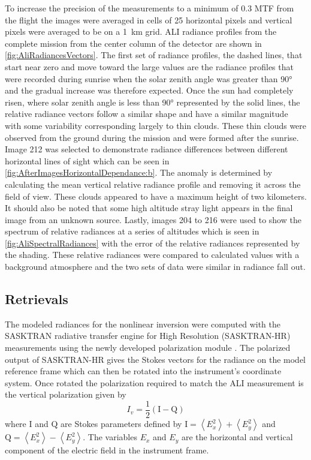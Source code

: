 \documentclass[12pt]{article}
\begin{document}
To increase the precision of the measurements to a minimum of 0.3 MTF from the flight the images were averaged in cells of 25 horizontal pixels and vertical pixels were averaged to be on a 1~km grid.  ALI radiance profiles from the complete mission from the center column of the detector are shown in \autoref{fig:AliRadiancesVectors}. The first set of radiance profiles, the dashed lines, that start near zero and move toward the large values are the radiance profiles that were recorded during sunrise when the solar zenith angle was greater than 90\si{\degree} and the gradual increase was therefore expected. Once the sun had completely risen, where solar zenith angle is less than 90\si{\degree} represented by the solid lines, the relative radiance vectors follow a similar shape and have a similar magnitude with some variability corresponding largely to thin clouds. These thin clouds were observed from the ground during the mission and were formed after the sunrise. Image 212 was selected to demonstrate radiance differences between different horizontal lines of sight which can be seen in \autoref{fig:AfterImagesHorizontalDependance:b}. The anomaly is determined by calculating the mean vertical relative radiance profile and removing it across the field of view. These clouds appeared to have a maximum height of two kilometers. It should also be noted that some high altitude stray light appears in the final image from an unknown source. Lastly, images 204 to 216 were used to show the spectrum of relative radiances at a series of altitudes which is seen in \autoref{fig:AliSpectralRadiances} with the error of the relative radiances represented by the shading. These relative radiances were compared to calculated values with a background atmosphere and the two sets of data were similar in radiance fall out.

\subsection{Retrievals}
\label{sec:retrievals}

The modeled radiances for the nonlinear inversion were computed with the SASKTRAN radiative transfer engine \citep{Bourassa2008a} for High Resolution (SASKTRAN-HR) \citep{Zawada2015} measurements using the newly developed polarization module \citep{Dueck2015}. The polarized output of SASKTRAN-HR gives the Stokes vectors for the radiance on the model reference frame which can then be rotated into the instrument's coordinate system. Once rotated the polarization required to match the ALI measurement is the vertical polarization given by
\begin{equation}
    I_{v} = \frac{1}{2}\left(\mathrm{I}-\mathrm{Q}\right)
\end{equation}
where $\mathrm{I}$ and $\mathrm{Q}$ are Stokes parameters defined by $\mathrm{I} = \left<E_{x}^{2}\right> + \left<E_{y}^{2}\right>$ and $\mathrm{Q} = \left<E_{x}^{2}\right> - \left<E_{y}^{2}\right>$. The variables $E_{x}$ and $E_{y}$ are the horizontal and vertical component of the electric field in the instrument frame.
\end{document}
